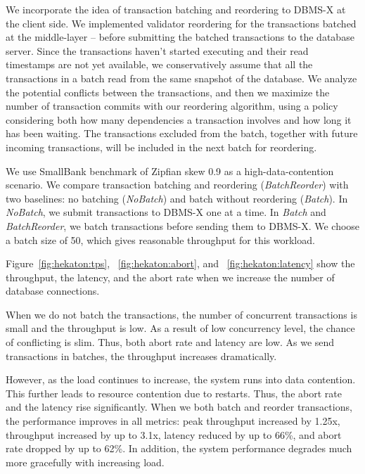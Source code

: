 We incorporate the idea of transaction batching and reordering to DBMS-X at the client side.
We implemented validator reordering for the transactions batched at the middle-layer -- before submitting the batched transactions to the database server. Since the transactions haven't started executing and their read timestamps are not yet available, we conservatively assume that all the transactions in a batch read from the same snapshot of the database. We analyze the potential conflicts between the transactions, and then we maximize the number of transaction commits with our reordering algorithm, using a policy considering both how many dependencies a transaction involves and how long it has been waiting. The transactions excluded from the batch, together with future incoming transactions, will be included in the next batch for reordering.

We use SmallBank benchmark of Zipfian skew 0.9 as a high-data-contention scenario. We compare transaction batching and reordering (\emph{BatchReorder}) with two baselines: no batching (\emph{NoBatch}) and batch without reordering (\emph{Batch}). In \emph{NoBatch}, we submit transactions to DBMS-X one at a time. In \emph{Batch} and \emph{BatchReorder}, we batch transactions before sending them to DBMS-X. We choose a batch size of 50, which gives reasonable throughput for this workload.

Figure~\ref{fig:hekaton:tps}, ~\ref{fig:hekaton:abort}, and ~\ref{fig:hekaton:latency} show the throughput, the latency, and the abort rate when we increase the number of database connections. 

	
When we do not batch the transactions, the number of concurrent transactions is small and the throughput is low. As a result of low concurrency level, the chance of conflicting is slim. Thus, both abort rate and latency are low. As we send transactions in batches, the throughput increases dramatically. 

However, as the load continues to increase, the system runs into data contention. This further leads to resource contention due to restarts. Thus, the abort rate and the latency rise significantly. When we both batch and reorder transactions, the performance improves in all metrics: peak throughput increased by 1.25x, throughput increased by up to 3.1x, latency reduced by up to 66\%, and abort rate dropped by up to 62\%. In addition, the system performance degrades much more gracefully with increasing load.
